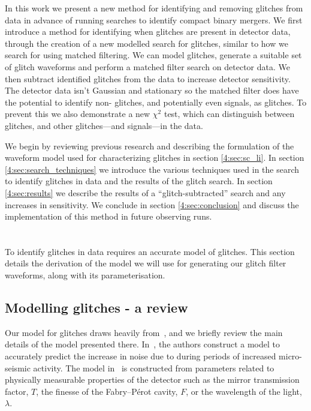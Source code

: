 In this work we present a new method for identifying and removing \scl{} glitches from \gw{} data in advance of running searches to identify compact binary mergers.
We first introduce a method for identifying when \scl{} glitches are present in detector data, through the creation of a new modelled search for \scl{} glitches, similar to how we search for \gws{} using matched filtering. We can model \scl{} glitches, generate a suitable set of glitch waveforms and perform a matched filter search on detector data. We then subtract identified glitches from the data to increase detector sensitivity. The detector data isn't Gaussian and stationary so the matched filter does have the potential to identify non-\scl{} glitches, and potentially even \gw{} signals, as \scl{} glitches. To prevent this we also demonstrate a new \scl{} $\chi^{2}$ test, which can distinguish between \scl{} glitches, and other glitches---and \gw{} signals---in the data.

We begin by reviewing previous research and describing the formulation of the waveform model used for characterizing \scl{} glitches in section \ref{4:sec:sc_li}. In section \ref{4:sec:search_techniques} we introduce the various techniques used in the search to identify \scl{} glitches in \gw{} data and the results of the \scl{} glitch search. In section \ref{4:sec:results} we describe the results of a ``glitch-subtracted'' \gw{} search and any increases in sensitivity. We conclude in section \ref{4:sec:conclusion} and discuss the implementation of this method in future observing runs.

\section{\label{4:sec:sc_li}\Scl{}}

To identify \scl{} glitches in \gw{} data requires an accurate model of \scl{} glitches. This section details the derivation of the model we will use for generating our \scl{} glitch filter waveforms, along with its parameterisation.

\subsection{Modelling \scl{} glitches - a review}

Our model for \scl{} glitches draws heavily from~\cite{TAccadia:2010}, and we briefly review the main details of the model presented there. In~\cite{TAccadia:2010}, the authors construct a model to accurately predict the increase in noise due to \scl{} during periods of increased micro-seismic activity. The model in~\cite{TAccadia:2010} is constructed from parameters related to physically measurable properties of the detector such as the mirror transmission factor, $T$, the finesse of the Fabry–Pérot cavity, $F$, or the wavelength of the light, $\lambda$.

